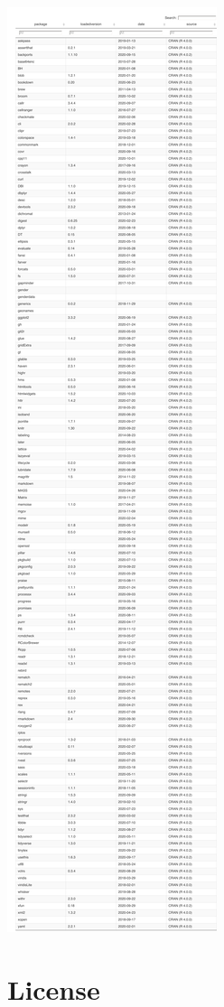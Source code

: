 \documentclass[
]{book}
\begin{document}
\includegraphics{index_files/figure-latex/unnamed-chunk-3-1.pdf}

\hypertarget{license}{%
\section*{License}\label{license}}
\end{document}
